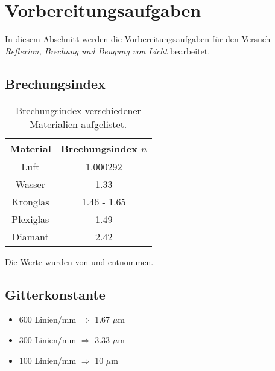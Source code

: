 \section{Vorbereitungsaufgaben}
\label{sec:Vorbereitungsaufgaben}

In diesem Abschnitt werden die Vorbereitungsaufgaben für den Versuch
\textit{Reflexion, Brechung und Beugung von Licht} bearbeitet.

\subsection{Brechungsindex}

\begin{table}
    \centering
    \caption{Brechungsindex verschiedener Materialien aufgelistet.}
    \begin{tabular}{c c}
        \toprule
        Material & Brechungsindex $n$ \\
        \midrule
        Luft & 1.000292 \\
        Wasser & 1.33 \\
        Kronglas & 1.46 - 1.65 \\
        Plexiglas & 1.49 \\
        Diamant & 2.42 \\
        \bottomrule
    \end{tabular}
    \label{tab:Brechungsindex}
\end{table}

Die Werte wurden von \cite{Chemie.de} und \cite{ISO489} entnommen.

\subsection{Gitterkonstante}

\begin{itemize}
    \item 600 Linien/mm $\Rightarrow$ 1.67 $\mu$m
    \item 300 Linien/mm $\Rightarrow$ 3.33 $\mu$m
    \item 100 Linien/mm $\Rightarrow$ 10 $\mu$m
\end{itemize}